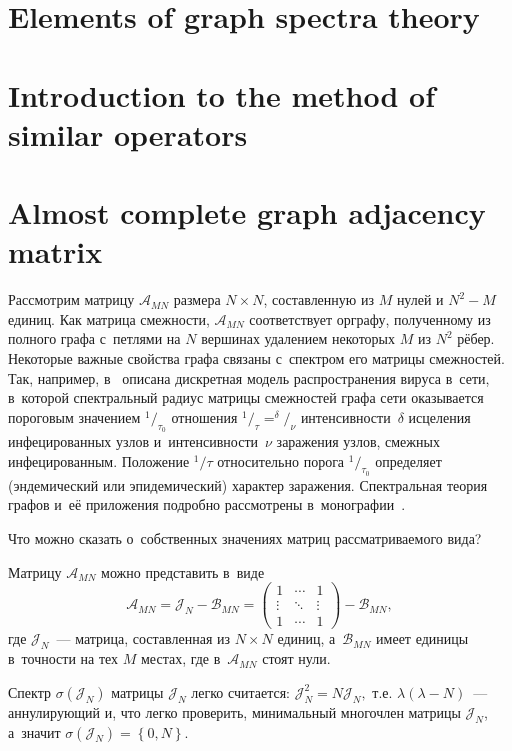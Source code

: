 \documentclass[a4paper]{article}
\theoremstyle{definition}
\begin{document}
\section{Elements of graph spectra theory}
\newpage

\section{Introduction to the method of similar operators}
\newpage

\section{Almost complete graph adjacency matrix}
\sloppy
Рассмотрим матрицу \( \mathscr{A}_{MN} \) размера \( N\times N \),
 составленную из \( M \) нулей и \( N^2 - M \) единиц.
Как матрица смежности, \( \mathscr{A}_{MN} \) соответствует орграфу,
 полученному из полного графа с~петлями на \( N \) вершинах
 удалением некоторых \( M \) из \( N^2 \) р\"ебер.
Некоторые важные свойства графа связаны с~спектром его матрицы смежностей.
Так, например, в~\cite{wang2003epidemic,chakrabarti2008epidemic} описана дискретная модель
 распространения вируса в~сети, в~которой спектральный радиус матрицы смежностей графа сети
 оказывается пороговым значением \( ^1/_{\tau_0} \) отношения \( ^1/_\tau = ^\delta/_\nu \)
интенсивности~\( \delta \) исцеления инфецированных узлов
 и~интенсивности~\( \nu \) заражения узлов, смежных инфецированным.
 Положение \(^1/\tau\) относительно порога \(^1/_{\tau_0}\) определяет
 (эндемический или эпидемический) характер заражения.
Спектральная теория графов и~е\"е приложения подробно рассмотрены
в~монографии~\cite{cvetkovic1980spectra,cvetkovic2010introduction,godsil2013algebraic}.

Что можно сказать о~собственных значениях матриц рассматриваемого вида?

Матрицу \( \mathscr{A}_{MN} \) можно представить в~виде
\[ \mathscr{A}_{MN} = \mathcal{J}_N - \mathscr{B}_{MN} =
    \begin{pmatrix}1 & \cdots & 1\\ \vdots & \ddots & \vdots \\ 1 & \cdots & 1\end{pmatrix} - \mathscr{B}_{MN}, \]
 где \( \mathcal{J}_N \)~--- матрица, составленная из \( N\times N \) единиц,
 а~\( \mathscr{B}_{MN} \) имеет единицы в~точности на тех \( M \) местах,
 где в~\( \mathscr{A}_{MN} \) стоят нули.

Спектр \( \sigma\left( \mathcal{J}_N \right) \)
 матрицы \( \mathcal{J}_N \) легко считается:
 \( \mathcal{J}_N^2 = N \mathcal{J}_N, \) т.е.
 \( \lambda(\lambda - N) \)~--- аннулирующий и, что легко проверить,
 минимальный многочлен матрицы \( \mathcal{J}_N \), а~значит
 \( \sigma\left( \mathcal{J}_N \right) = \left\{ 0,N \right\}. \)
\end{document}
